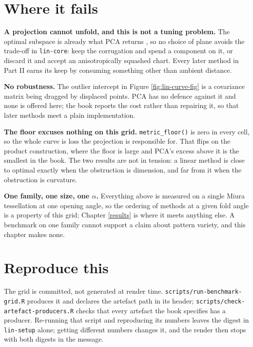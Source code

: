 \documentclass[
  british,
  a4paper,
]{book}
\newcounter{none} %
\begin{document}
\section{Where it fails}\label{lin-limits}

\textbf{A projection cannot unfold, and this is not a tuning problem.} The optimal
subspace is already what PCA returns \citep{eckart1936approximation}, so no choice of
plane avoids the trade-off in \texttt{lin-core}: keep the corrugation and spend a
component on it, or discard it and accept an anisotropically squashed chart.
Every later method in Part II earns its keep by consuming something other than
ambient distance.

\textbf{No robustness.} The outlier intercept in Figure \ref{fig:lin-curve-fig} is a
covariance matrix being dragged by displaced points. PCA has no defence against
it and none is offered here; the book reports the cost rather than repairing it,
so that later methods meet a plain implementation.

\textbf{The floor excuses nothing on this grid.} \texttt{metric\_floor()} is zero in every
cell, so the whole curve is loss the projection is responsible for. That flips on
the product construction, where the floor is large and PCA's excess above it is
the smallest in the book. The two results are not in tension: a linear method is
close to optimal exactly when the obstruction is dimension, and far from it when
the obstruction is curvature.

\textbf{One family, one size, one \(\alpha\).} Everything above is measured on a single
Miura tessellation at one opening angle, so the ordering of methods at a given
fold angle is a property of this grid; Chapter \ref{results} is where it meets
anything else. A benchmark on one family cannot support a claim about pattern
variety, and this chapter makes none.

\section{Reproduce this}\label{lin-reproduce}

The grid is committed, not generated at render time.
\texttt{scripts/run-benchmark-grid.R} produces it and declares the artefact path in its
header; \texttt{scripts/check-artefact-producers.R} checks that every artefact the book
specifies has a producer. Re-running that script and reproducing its numbers
leaves the digest in \texttt{lin-setup} alone; getting different numbers changes it, and
the render then stops with both digests in the message.
\end{document}
